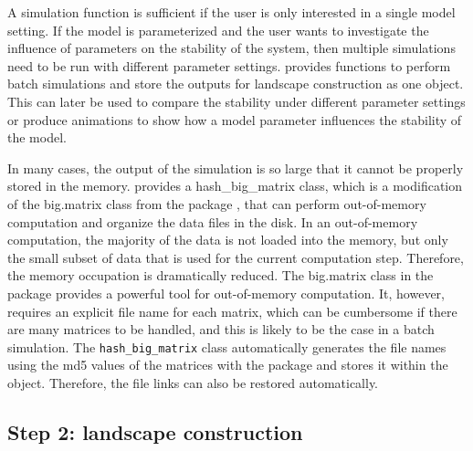 A simulation function is sufficient if the user is only interested in a single model setting. If the model is parameterized and the user wants to investigate the influence of parameters on the stability of the system, then multiple simulations need to be run with different parameter settings.  provides functions to perform batch simulations and store the outputs for landscape construction as one object. This can later be used to compare the stability under different parameter settings or produce animations to show how a model parameter influences the stability of the model.

In many cases, the output of the simulation is so large that it cannot be properly stored in the memory.  provides a hash\_big\_matrix class, which is a modification of the big.matrix class from the  package \citep{KaneEtAlScalableStrategiesComputing2013}, that can perform out-of-memory computation and organize the data files in the disk. In an out-of-memory computation, the majority of the data is not loaded into the memory, but only the small subset of data that is used for the current computation step. Therefore, the memory occupation is dramatically reduced. The big.matrix class in the  package provides a powerful tool for out-of-memory computation. It, however, requires an explicit file name for each matrix, which can be cumbersome if there are many matrices to be handled, and this is likely to be the case in a batch simulation. The \texttt{hash\_big\_matrix} class automatically generates the file names using the md5 values of the matrices with the  package\citep{EddelbuettelEtAlPkgdigestCreateCompact2021} and stores it within the object. Therefore, the file links can also be restored automatically.

\subsection{Step 2: landscape construction}\label{step-2-landscape-construction}

